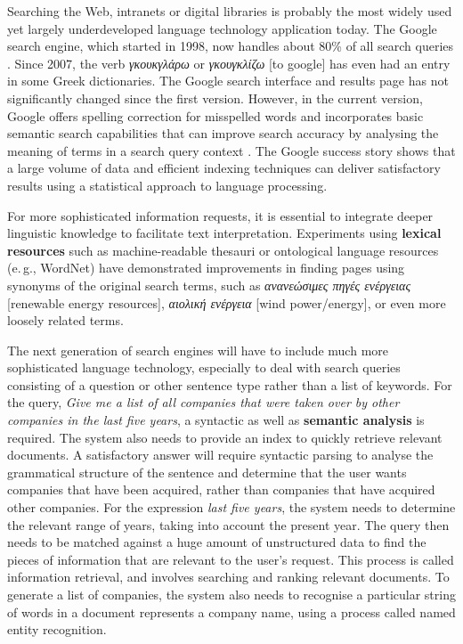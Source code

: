 \begin{multicols}{2}
Searching the Web, intranets or digital libraries is probably the most widely used yet largely underdeveloped language technology application today. The Google search engine, which started in 1998, now handles about 80\% of all search queries \cite{spi1}. Since 2007, the verb \textit{γκουκγλάρω} or \textit{γκουγκλίζω} [to google] has even had an entry in some Greek dictionaries. The Google search interface and results page has not significantly changed since the first version. However, in the current version, Google offers spelling correction for misspelled words and incorporates basic semantic search capabilities that can improve search accuracy by analysing the meaning of terms in a search query context \cite{pc1}. The Google success story shows that a large volume of data and efficient indexing techniques can deliver satisfactory results using a statistical approach to language processing. 

For more sophisticated information requests, it is essential to integrate deeper linguistic knowledge to facilitate text interpretation. Experiments using \textbf{lexical resources} such as machine-readable thesauri or ontological language resources (e.\,g., WordNet) have demonstrated improvements in finding pages using synonyms of the original search terms, such as \textit{ανανεώσιμες πηγές ενέργειας} {[}renewable energy resources{]}, \textit{αιολική ενέργεια} {[}wind power/energy{]}, or even more loosely related terms.

The next generation of search engines will have to include much more sophisticated language technology, especially to deal with search queries consisting of a question or other sentence type rather than a list of keywords. For the query, \textit{Give me a list of all companies that were taken over by other companies in the last five years}, a syntactic as well as \textbf{semantic analysis} is required. The system also needs to provide an index to quickly retrieve relevant documents. A satisfactory answer will require syntactic parsing to analyse the grammatical structure of the sentence and determine that the user wants companies that have been acquired, rather than companies that have acquired other companies. For the expression \textit{last five years}, the system needs to determine the relevant range of years, taking into account the present year. The query then needs to be matched against a huge amount of unstructured data to find the pieces of information that are relevant to the user’s request. This process is called information retrieval, and involves searching and ranking relevant documents. To generate a list of companies, the system also needs to recognise a particular string of words in a document represents a company name, using a process called named entity recognition.


\end{multicols}
